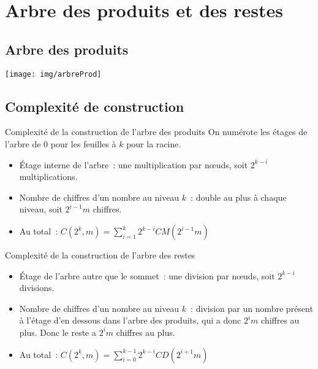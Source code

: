 \documentclass{beamer}
\begin{document}
\section{Arbre des produits et des restes}
\subsection{Arbre des produits}
\begin{frame}
  \texttt{[image: img/arbreProd]}  
\end{frame}

\subsection{Complexité de construction}
\begin{frame}
  \begin{block}{Complexité de la construction de l'arbre des produits}
  On numérote les étages de l'arbre de $0$ pour les feuilles à $k$ pour la racine. 
   \begin{itemize}
    \item Étage interne de l'arbre~: une multiplication par nœuds, soit $2^{k-i}$ multiplications.
    \item Nombre de chiffres d'un nombre au niveau $k$~: double au plus à chaque niveau, soit $2^{i-1}m$ chiffres.
    \item Au total~: $C(2^k,m) = \sum_{i=1}^k 2^{k-i}CM(2^{i-1}m)$
   \end{itemize}
  \end{block}
  \begin{block}{Complexité de la construction de l'arbre des restes}
    \begin{itemize}
    \item Étage de l'arbre autre que le sommet~: une division par nœuds, soit $2^{k-i}$ divisions.
    \item Nombre de chiffres d'un nombre au niveau $k$~: division par un nombre présent à l'étage d'en dessous dans l'arbre des produits, qui a donc $2^{i}m$ chiffres au plus. Donc le reste a $2^{i}m$ chiffres au plus.
    \item Au total~: $C(2^k,m) = \sum_{i=0}^{k-1} 2^{k-i}CD(2^{i+1}m)$
   \end{itemize}
  \end{block}
\end{frame}
\end{document}

